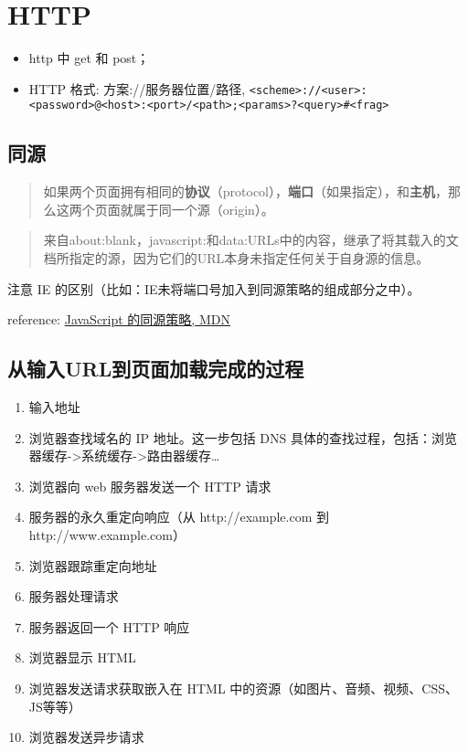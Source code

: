 \section{HTTP}\label{http}

\begin{itemize}
\tightlist
\item
  http 中 get 和 post；
\item
  HTTP 格式: 方案://服务器位置/路径,
  \lstinline!<scheme>://<user>:<password>@<host>:<port>/<path>;<params>?<query>#<frag>!
\end{itemize}

\subsection{同源}\label{ux540cux6e90}

\begin{quote}
如果两个页面拥有相同的\textbf{协议}（protocol），\textbf{端口}（如果指定），和\textbf{主机}，那么这两个页面就属于同一个源（origin）。
\end{quote}

\begin{quote}
来自about:blank，javascript:和data:URLs中的内容，继承了将其载入的文档所指定的源，因为它们的URL本身未指定任何关于自身源的信息。
\end{quote}

注意 IE 的区别（比如：IE未将端口号加入到同源策略的组成部分之中）。

reference:
\href{https://developer.mozilla.org/zh-CN/docs/Web/Security/Same-origin_policy}{JavaScript
的同源策略, MDN}

\subsection{从输入URL到页面加载完成的过程}\label{ux4eceux8f93ux5165urlux5230ux9875ux9762ux52a0ux8f7dux5b8cux6210ux7684ux8fc7ux7a0b}

\begin{enumerate}
\def\labelenumi{\arabic{enumi}.}
\tightlist
\item
  输入地址
\item
  浏览器查找域名的 IP 地址。这一步包括 DNS
  具体的查找过程，包括：浏览器缓存-\textgreater{}系统缓存-\textgreater{}路由器缓存\ldots{}
\item
  浏览器向 web 服务器发送一个 HTTP 请求
\item
  服务器的永久重定向响应（从 http://example.com 到
  http://www.example.com）
\item
  浏览器跟踪重定向地址
\item
  服务器处理请求
\item
  服务器返回一个 HTTP 响应
\item
  浏览器显示 HTML
\item
  浏览器发送请求获取嵌入在 HTML
  中的资源（如图片、音频、视频、CSS、JS等等）
\item
  浏览器发送异步请求
\end{enumerate}

